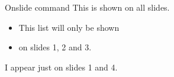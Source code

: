 \documentclass{beamer}
\begin{document}
 \begin{frame}{Onslide command}
This is shown on all slides.

\begin{itemize}
    \item This list will only be shown
    \item on slides 1, 2 and 3.
\end{itemize}

I appear just on slides 1 and 4.

\end{frame}
\end{document}
